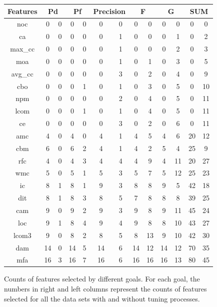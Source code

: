 \documentclass{sig-alternative}
\def\baselinestretch{1}
\begin{document}
\begin{figure}[!ht]

\renewcommand{\baselinestretch}{0.7}
\scriptsize
\centering
  \begin{tabular}{c|c c|c c|c c|c c|c c|c c }
  \hline\hline
  Features & \multicolumn{2}{c}{Pd} & \multicolumn{2}{c}{Pf} & \multicolumn{2}{c}{Precision} & \multicolumn{2}{c}{F} & \multicolumn{2}{c}{G} & \multicolumn{2}{c}{SUM}
\\\hline
  noc& 0& 0& 0& 0& 0& 0& 0& 0& 0& 0& 0& 0\\
ca& 0& 0& 0& 0& 0& 1& 0& 0& 0& 1& 0& 2\\
max\_cc& 0& 0& 0& 0& 0& 1& 0& 0& 0& 2& 0& 3\\
moa& 0& 0& 0& 0& 0& 1& 0& 1& 0& 3& 0& 5\\
avg\_cc& 0& 0& 0& 0& 0& 3& 0& 2& 0& 4& 0& 9\\
cbo& 0& 0& 0& 1& 0& 1& 0& 3& 0& 5& 0& 10\\
npm& 0& 0& 0& 0& 0& 2& 0& 4& 0& 5& 0& 11\\
lcom& 0& 0& 0& 1& 0& 1& 0& 4& 0& 5& 0& 11\\
ce& 0& 0& 0& 0& 0& 3& 0& 2& 0& 6& 0& 11\\
amc& 4& 0& 4& 0& 4& 1& 4& 5& 4& 6& 20& 12\\
cbm& 6& 0& 6& 2& 4& 1& 4& 2& 5& 4& 25& 9\\
rfc& 4& 0& 4& 3& 4& 4& 4& 9& 4& 11& 20& 27\\
wmc& 5& 0& 5& 1& 5& 3& 5& 7& 5& 12& 25& 23\\
ic& 8& 1& 8& 1& 9& 3& 8& 8& 9& 5& 42& 18\\
dit& 8& 1& 8& 3& 8& 5& 7& 8& 8& 8& 39& 25\\
cam& 9& 0& 9& 2& 9& 3& 9& 8& 9& 11& 45& 24\\
loc& 9& 1& 8& 4& 9& 4& 9& 8& 8& 10& 43& 27\\
lcom3& 9& 0& 8& 2& 8& 5& 8& 13& 9& 10& 42& 30\\
dam& 14& 0& 14& 5& 14& 6& 14& 12& 14& 12& 70& 35\\
mfa& 16& 3& 16& 7& 16& 6& 16& 16& 16& 13& 80& 45\\

  \end{tabular}
    \caption{Counts of features selected by different goals. For each goal, the numbers in right and left columns represent the counts of features selected for all the data sets with and without tuning processes.}
\end{figure}
\end{document}
